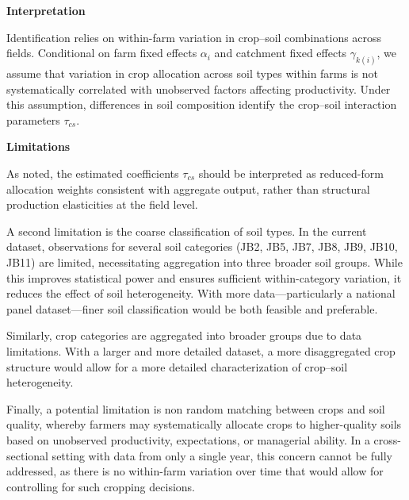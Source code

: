 \documentclass{article}
\begin{document}
\textbf{Interpretation}

Identification relies on within-farm variation in crop--soil combinations across fields. Conditional on farm fixed effects $\alpha_i$ and catchment fixed effects $\gamma_{k(i)}$, we assume that variation in crop allocation across soil types within farms is not systematically correlated with unobserved factors affecting productivity. Under this assumption, differences in soil composition identify the crop--soil interaction parameters $\tau_{cs}$.


\textbf{Limitations}

As noted, the estimated coefficients $\tau_{cs}$ should be interpreted as reduced-form allocation weights consistent with aggregate output, rather than structural production elasticities at the field level.

A second limitation is the coarse classification of soil types. In the current dataset, observations for several soil categories (JB2, JB5, JB7, JB8, JB9, JB10, JB11) are limited, necessitating aggregation into three broader soil groups. While this improves statistical power and ensures sufficient within-category variation, it reduces the effect of soil heterogeneity. With more data—particularly a national panel dataset—finer soil classification would be both feasible and preferable.

Similarly, crop categories are aggregated into broader groups due to data limitations. With a larger and more detailed dataset, a more disaggregated crop structure would allow for a more detailed characterization of crop–soil heterogeneity.

Finally, a potential limitation is non random matching between crops and soil quality, whereby farmers may systematically allocate crops to higher-quality soils based on unobserved productivity, expectations, or managerial ability. In a cross-sectional setting with data from only a single year, this concern cannot be fully addressed, as there is no within-farm variation over time that would allow for controlling for such cropping decisions.
\end{document}
